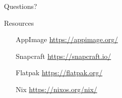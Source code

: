 \documentclass{lug}
\begin{document}
\begin{frame}[standout]
    \Huge
    Questions?
\end{frame}

\begin{frame}{Resources}
    \begin{enumerate}[leftmargin=2cm]
        \item[AppImage] \url{https://appimage.org/}
        \item[Snapcraft] \url{https://snapcraft.io/}
        \item[Flatpak] \url{https://flatpak.org/}
        \item[Nix] \url{https://nixos.org/nix/}
    \end{enumerate}
\end{frame}
\end{document}
